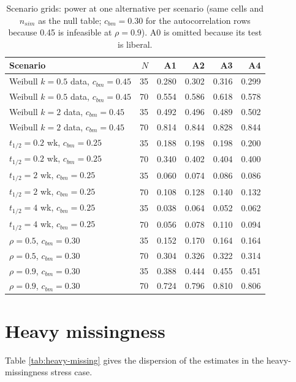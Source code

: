 \documentclass[
  11pt,
]{article}
\begin{document}
\begin{table}
\centering
\caption{\label{tab:stage4-grid-alt}Scenario grids: power at one alternative per
    scenario (same cells and $n_{sim}$ as the null table; $c_{bm} =
    0.30$ for the autocorrelation rows because 0.45 is infeasible at
    $\rho = 0.9$). A0 is omitted because its test is liberal.}
\centering
\fontsize{9}{11}\selectfont
\begin{tabular}[t]{lrrrrr}
\toprule
Scenario & $N$ & A1 & A2 & A3 & A4\\
\midrule
Weibull $k = 0.5$ data, $c_{bm} = 0.45$ & 35 & 0.280 & 0.302 & 0.316 & 0.299\\
Weibull $k = 0.5$ data, $c_{bm} = 0.45$ & 70 & 0.554 & 0.586 & 0.618 & 0.578\\
Weibull $k = 2$ data, $c_{bm} = 0.45$ & 35 & 0.492 & 0.496 & 0.489 & 0.502\\
Weibull $k = 2$ data, $c_{bm} = 0.45$ & 70 & 0.814 & 0.844 & 0.828 & 0.844\\
$t_{1/2} = 0.2$ wk, $c_{bm} = 0.25$ & 35 & 0.188 & 0.198 & 0.198 & 0.200\\
\addlinespace
$t_{1/2} = 0.2$ wk, $c_{bm} = 0.25$ & 70 & 0.340 & 0.402 & 0.404 & 0.400\\
$t_{1/2} = 2$ wk, $c_{bm} = 0.25$ & 35 & 0.060 & 0.074 & 0.086 & 0.086\\
$t_{1/2} = 2$ wk, $c_{bm} = 0.25$ & 70 & 0.108 & 0.128 & 0.140 & 0.132\\
$t_{1/2} = 4$ wk, $c_{bm} = 0.25$ & 35 & 0.038 & 0.064 & 0.052 & 0.062\\
$t_{1/2} = 4$ wk, $c_{bm} = 0.25$ & 70 & 0.056 & 0.078 & 0.110 & 0.094\\
\addlinespace
$\rho = 0.5$, $c_{bm} = 0.30$ & 35 & 0.152 & 0.170 & 0.164 & 0.164\\
$\rho = 0.5$, $c_{bm} = 0.30$ & 70 & 0.304 & 0.326 & 0.322 & 0.314\\
$\rho = 0.9$, $c_{bm} = 0.30$ & 35 & 0.388 & 0.444 & 0.455 & 0.451\\
$\rho = 0.9$, $c_{bm} = 0.30$ & 70 & 0.724 & 0.796 & 0.810 & 0.806\\
\bottomrule
\end{tabular}
\end{table}

\section{Heavy missingness}\label{heavy-missingness}

Table \ref{tab:heavy-missing} gives the dispersion of the estimates
in the heavy-missingness stress case.
\end{document}
